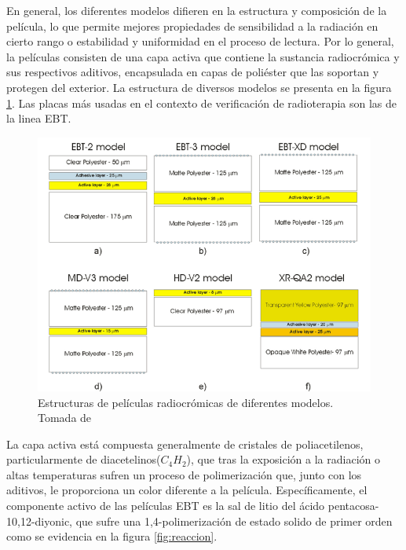 En general, los diferentes modelos difieren en la estructura y composición de la película, lo que permite mejores propiedades de sensibilidad a la radiación en cierto rango o estabilidad y uniformidad en el proceso de lectura. Por lo general, la películas consisten de una capa activa que contiene la sustancia radiocrómica y sus respectivos aditivos, encapsulada en capas de poliéster que las soportan y protegen del exterior. La estructura de diversos modelos se presenta en la figura \ref{fig:Estructuras}. Las placas más usadas en el contexto de verificación de radioterapia son las de la linea EBT.\\
\begin{figure}[H]
	\centering
	\includegraphics[width=\linewidth]{images/modelos.png}
	\caption{Estructuras de películas radiocrómicas de diferentes modelos. Tomada de \cite{Devic2016}}
	\label{fig:Estructuras}
\end{figure}

La capa activa está compuesta generalmente de cristales de poliacetilenos\cite{Williams2011}, particularmente de diacetelinos($C_4H_2$), que tras la exposición a la radiación o altas temperaturas sufren un proceso de polimerización que, junto con los aditivos, le proporciona un color diferente a la película. Específicamente, el componente activo de las películas EBT es la sal de litio del ácido pentacosa-10,12-diyonic, que sufre una 1,4-polimerización de estado solido de primer orden como se evidencia en la figura \ref{fig:reaccion}.\\  

